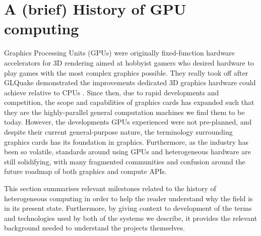 \documentclass[a4paper,12pt,twoside,openright]{report}
\begin{document}


\section{A (brief) History of GPU computing}

\label{sec:history_gpu}

Graphics Processing Units (GPUs) were originally fixed-function hardware
accelerators for 3D rendering aimed at hobbyist gamers who desired hardware to
play games with the most complex graphics possible. They really took off after
GLQuake demonstrated the improvements dedicated 3D graphics hardware could
achieve relative to CPUs \cite{GLQuake}. Since then, due to rapid developments
and competition, the scope and capabilities of graphics cards has expanded such
that they are the highly-parallel general computation machines we find them to
be today. However, the developments GPUs experienced were not pre-planned, and
despite their current general-purpose nature, the terminology surrounding
graphics cards has its foundation in graphics. Furthermore, as the industry has
been so volatile, standards around using GPUs and heterogeneous hardware are
still solidifying, with many fragmented communities and confusion around the
future roadmap of both graphics and compute APIs.

This section summarises relevant milestones related to the history of
heterogeneous computing in order to help the reader understand why the field is
in its present state. Furthermore, by giving context to development of the
terms and technologies used by both of the systems we describe, it provides the
relevant background needed to understand the projects themselves.

\end{document}
